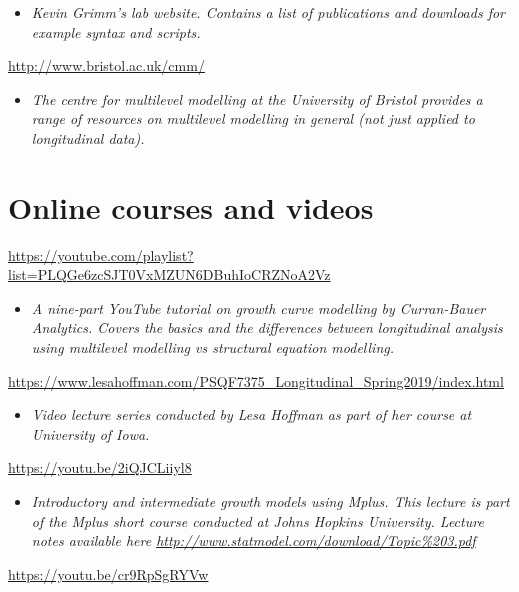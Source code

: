 \documentclass[
]{book}
\providecommand{\tightlist}{%
  \setlength{\itemsep}{0pt}\setlength{\parskip}{0pt}}
\begin{document}
\begin{itemize}
\tightlist
\item
  \emph{Kevin Grimm's lab website. Contains a list of publications and downloads for example syntax and scripts. }
\end{itemize}

\url{http://www.bristol.ac.uk/cmm/}

\begin{itemize}
\tightlist
\item
  \emph{The centre for multilevel modelling at the University of Bristol provides a range of resources on multilevel modelling in general (not just applied to longitudinal data). }
\end{itemize}

\section{Online courses and videos}\label{online-courses-and-videos-1}

\url{https://youtube.com/playlist?list=PLQGe6zcSJT0VxMZUN6DBuhIoCRZNoA2Vz}

\begin{itemize}
\tightlist
\item
  \emph{A nine-part YouTube tutorial on growth curve modelling by Curran-Bauer Analytics. Covers the basics and the differences between longitudinal analysis using multilevel modelling vs structural equation modelling.}
\end{itemize}

\url{https://www.lesahoffman.com/PSQF7375_Longitudinal_Spring2019/index.html}

\begin{itemize}
\tightlist
\item
  \emph{Video lecture series conducted by Lesa Hoffman as part of her course at University of Iowa. }
\end{itemize}

\url{https://youtu.be/2iQJCLiiyl8}

\begin{itemize}
\tightlist
\item
  \emph{Introductory and intermediate growth models using Mplus. This lecture is part of the Mplus short course conducted at Johns Hopkins University. Lecture notes available here \url{http://www.statmodel.com/download/Topic\%203.pdf} }
\end{itemize}

\url{https://youtu.be/cr9RpSgRYVw}
\end{document}
